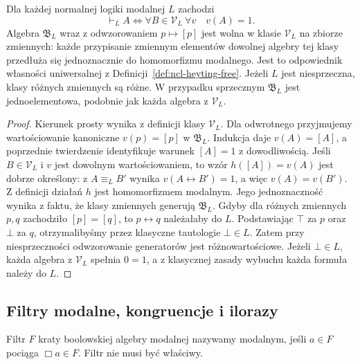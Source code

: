 \begin{wniosek}
\label{cor:ncl-modal-algebra-theorem-completeness}
Dla każdej normalnej logiki modalnej $L$ zachodzi
\[
 \vdash_L A
 \iff \forall B\in\mathcal V_L\ \forall v\quad v(A)=1.
\]
Algebra $\mathfrak B_L$ wraz z odwzorowaniem
$p\mapsto[p]$ jest wolna w klasie $\mathcal V_L$
na zbiorze zmiennych: każde przypisanie zmiennym
elementów dowolnej algebry tej klasy przedłuża
się jednoznacznie do homomorfizmu modalnego.
Jest to odpowiednik własności uniwersalnej z
Definicji~\ref{def:ncl-heyting-free}.
Jeżeli $L$ jest niesprzeczna, klasy różnych
zmiennych są różne. W przypadku sprzecznym
$\mathfrak B_L$ jest jednoelementowa, podobnie
jak każda algebra z $\mathcal V_L$.
\end{wniosek}
\begin{proof}
Kierunek prosty wynika z definicji klasy
$\mathcal V_L$. Dla odwrotnego przyjmujemy
wartościowanie kanoniczne $v(p)=[p]$
w $\mathfrak B_L$. Indukcja daje $v(A)=[A]$,
a poprzednie twierdzenie identyfikuje
warunek $[A]=1$ z dowodliwością.
Jeśli $B\in\mathcal V_L$ i $v$ jest
dowolnym wartościowaniem, to wzór
$h([A])=v(A)$ jest dobrze określony:
z $A\equiv_L B'$ wynika $v(A\leftrightarrow B')=1$,
a więc $v(A)=v(B')$.
Z definicji działań $h$ jest homomorfizmem
modalnym. Jego jednoznaczność wynika z faktu,
że klasy zmiennych generują $\mathfrak B_L$.
Gdyby dla różnych zmiennych $p,q$ zachodziło
$[p]=[q]$, to $p\leftrightarrow q$ należałaby do $L$.
Podstawiając $\top$ za $p$ oraz $\bot$ za $q$,
otrzymalibyśmy przez klasyczne tautologie
$\bot\in L$. Zatem przy niesprzeczności
odwzorowanie generatorów jest różnowartościowe.
Jeżeli $\bot\in L$, każda algebra z $\mathcal V_L$
spełnia $0=1$, a z klasycznej zasady wybuchu
każda formuła należy do $L$.
\end{proof}

\subsection{Filtry modalne, kongruencje i ilorazy}

\begin{definicja}
\label{def:ncl-modal-filter}
Filtr $F$ kraty boolowskiej algebry modalnej
nazywamy modalnym, jeśli
$a\in F$ pociąga $\Box a\in F$.
Filtr nie musi być właściwy.
\end{definicja}

